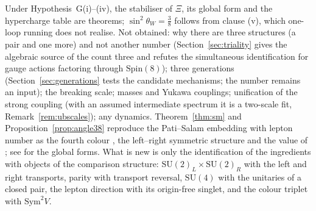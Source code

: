 \documentclass[aps,pra,onecolumn,superscriptaddress,nofootinbib,10pt]{revtex4-2}
\theoremstyle{definition}
\theoremstyle{remark}
\newcommand{\SU}{\mathrm{SU}}
\begin{document}
\smallskip
Under Hypothesis~G(i)--(iv), the stabiliser of $\Xi$, its global form and the hypercharge table are
theorems; $\sin^2\theta_W=\tfrac38$ follows from clause (v), which one-loop running does not realise.  Not obtained: why there are
three structures (a pair and one more) and not another number (Section~\ref{sec:triality} gives the
algebraic source of the count three and refutes the simultaneous identification for gauge actions factoring
through $\mathrm{Spin}(8)$); three generations (Section~\ref{sec:generations} tests the candidate
mechanisms; the number remains an input); the breaking
scale; masses and Yukawa couplings; unification of the strong coupling (with an assumed intermediate
spectrum it is a two-scale fit, Remark~\ref{rem:ubscales}); any dynamics.
Theorem~\ref{thm:sm} and Proposition~\ref{prop:angle38} reproduce the Pati--Salam embedding with
lepton number as the fourth colour \cite{PatiSalam}, the left--right symmetric structure
\cite{MohapatraPati,SenjanovicMohapatra} and the value of \cite{GQW}; see \cite{BaezHuerta} for the
global forms.  What is new is only the identification of the ingredients with objects of the
comparison structure: $\SU(2)_L\times\SU(2)_R$ with the left and right transports, parity with
transport reversal, $\SU(4)$ with the unitaries of a closed pair, the lepton direction with its
origin-free singlet, and the colour triplet with $\mathrm{Sym}^2V$.
\end{document}

